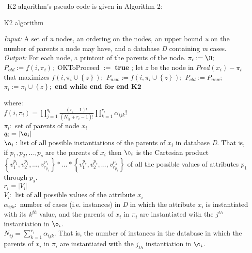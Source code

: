 \documentclass[a4,12pt]{ozu-thesis}
\begin{document}
\ K2 algorithm's pseudo code is given in Algorithm 2:

\makeatletter
\def\BState{\State\hskip-\ALG@thistlm}
\makeatother

\begin{algorithm}
\caption{K2 algorithm}
\label{euclid}
\begin{algorithmic}[1]
\State \textit{Input:} A set of \textit{n} nodes, an ordering on the nodes, an upper bound \textit{u} on the number of parents a node may have, and a database \textit{D} containing \textit{m} cases. 
\State \textit{Output:} For each node, a printout of the parents of the node. 
    \State $\pi _{i} :=  \O ;$
    \State $P_{old} := f\left ( i, \pi _{i} \right );$
    \State OKToProceed $:=$ \textbf{true };
    \State let $ \textit{z} $ be the node in $Pred\left ( x_{i} \right ) - \pi _{i}$ that maximizes $f\left ( i, \pi _{i} \cup \left \{ z \right \}\right );$
    \State $P_{new} := f\left ( i, \pi _{i} \cup \left \{ z \right \}\right );$
       \State $P_{old} := P_{new};$
       \State $\pi _{i} := \pi _{i} \cup \left \{ z \right \};$
     \EndIf
         \EndWhile
         \State \textbf{end ${\textbf{while}}$ }
\EndFor
\State \textbf{end ${\textbf{for}}$ }
\State \textbf{end ${\textbf{K2}}$ }
\EndProcedure
\end{algorithmic}
\end{algorithm}

\newpage
where: 
\\ $ f\left ( i, \pi _{i}\right ) = \prod_{j=1}^{q_{i}} \frac{\left ( r_{i} - 1 \right )!}{\left ( N_{ij} +r_{i} -1 \right )!} \prod_{k=1}^{r_{i}} \alpha _{ijk}! $
\\ $  \pi _{i} :$ set of parents of node $x_{i}$ 
\\ $ q_{i} = \left | \o _{i} \right | $
\\ $ \o _{i} : $ list of all possible instantiations of the parents of $x_{i}$ in database \textit{D}. That is, if $p_{1}, p_{2},...,p_{s}$ are the parents of  $x_{i}$ then $ \o _{i}$ is the Cartesian product $\left \{ v_{1}^{p_{1}}, v_{2}^{p_{1}},...,v_{r_{p_{1}}}^{p_{1}} \right \}*...*\left \{ v_{1}^{p_{s}}, v_{2}^{p_{s}},...,v_{r_{p_{1}}}^{p_{s}} \right \}$ of all the possible values of attributes $p_{1}$ through $p_{s}$. 
\\ $r_{i} = \left | V_{i} \right |$
\\ $V_{i}: $ list of all possible values of the attribute $x_{i}$
\\ $\alpha _{ijk}:$ number of cases (i.e. instances) in \textit{D} in which the attribute $x_{i}$ is instantiated with its $k^{th}$ value, and the parents of $x_{i}$ in $\pi _{i}$ are instantiated with the $j^{th}$ instantiation in $\o _{i}$.
\\ $N_{ij} = \sum_{k=1}^{r_{i}} \alpha _{ijk}$. That is, the number of instances in the database in which the parents of $x_{i}$ in $\pi _{i}$ are instantiated with the $j_{th}$ instantiation in $\o _{i}$.
\end{document}
